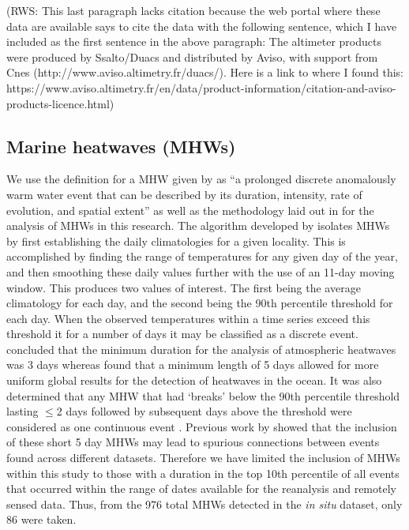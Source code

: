 \documentclass[a4paper,10pt,review]{elsarticle}
\begin{document}
(RWS: This last paragraph lacks citation because the web portal where these data are available says to cite the data with the following sentence, which I have included as the first sentence in the above paragraph:
The altimeter products were produced by Ssalto/Duacs and distributed by Aviso, with support from Cnes (http://www.aviso.altimetry.fr/duacs/).
Here is a link to where I found this:
https://www.aviso.altimetry.fr/en/data/product-information/citation-and-aviso-products-licence.html)

\subsection{Marine heatwaves (MHWs)}
We use the definition for a MHW given by \citet{Hobday2016} as ``a prolonged discrete anomalously warm water event that can be described by its duration, intensity, rate of evolution, and spatial extent'' as well as the methodology laid out in \citet{Hobday2016} for the analysis of MHWs in this research. The algorithm developed by \citet{Hobday2016} isolates MHWs by first establishing the daily climatologies for a given locality. This is accomplished by finding the range of temperatures for any given day of the year, and then smoothing these daily values further with the use of an 11-day moving window. This produces two values of interest. The first being the average climatology for each day, and the second being the 90th percentile threshold for each day. When the observed temperatures within a time series exceed this threshold it for a number of days it may be classified as a discrete event. \citet{Perkins2013} concluded that the minimum duration for the analysis of atmospheric heatwaves was 3 days whereas \citet{Hobday2016} found that a minimum length of 5 days allowed for more uniform global results for the detection of heatwaves in the ocean. It was also determined that any MHW that had `breaks' below the 90th percentile threshold lasting $\leq$2 days followed by subsequent days above the threshold were considered as one continuous event \citep{Hobday2016}. Previous work by \citet{Schlegel2017} showed that the inclusion of these short 5 day MHWs may lead to spurious connections between events found across different datasets. Therefore we have limited the inclusion of MHWs within this study to those with a duration in the top 10th percentile of all events that occurred within the range of dates available for the reanalysis and remotely sensed data. Thus, from the 976 total MHWs detected in the \emph{in situ} dataset, only 86 were taken.
\end{document}
